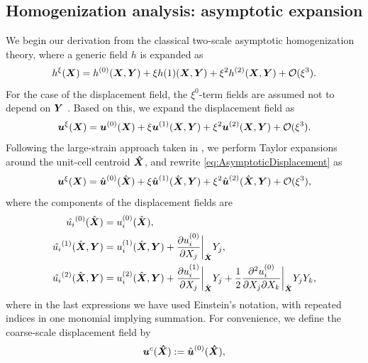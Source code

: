 \documentclass[preprint,3p,12pt,number,sort&compress]{elsarticle}
\def\vec   #1{\text{\boldmath $#1$}{}}
\begin{document}
\subsection{Homogenization analysis: asymptotic expansion}
We begin our derivation from the classical two-scale asymptotic homogenization theory, where a generic field $h$ is expanded as
\begin{equation}
    h^{\xi}({\vec X}) =h^{(0)}({\vec X}, \vec Y) +\xi h{(1)}({\vec X}, \vec Y) +\xi^2 h^{(2)}({\vec X}, \vec Y) + \mathcal O(\xi^3).
\end{equation} 
For the case of the displacement field, the $\xi^{0}$-term fields are assumed not to depend on $\vec Y$ \cite{fish2013practical}. Based on this, we expand the displacement field as
 \begin{equation}
	\vec u^{\xi} (\vec X) = {\vec u}^{(0)} ({\vec X}) + \xi {\vec u}^{(1)}({\vec X}, \vec Y) + \xi^2 {\vec u}^{(2)} ({\vec X}, \vec Y) + \mathcal O(\xi^3). \label{eq:AsymptoticDisplacement}
\end{equation}
Following the large-strain approach taken in \cite{fish2013practical,fish2008mathematical}, we perform Taylor expansions around the unit-cell centroid $\vec{\hat{X}}$, and rewrite \eqref{eq:AsymptoticDisplacement} as
\begin{equation}
	\vec u^{\xi} (\vec X) = \hat{\vec u}^{(0)} (\hat{\vec X}) + \xi \hat{\vec u}^{(1)}(\hat{\vec X}, \vec Y) + \xi^2 \hat{\vec u}^{(2)} (\hat{\vec X}, \vec Y) + \mathcal O(\xi^3), \label{eq:AsymptoticDisplacement}
\end{equation}
where the components of the displacement fields are
\begin{align}
      \hat{u_i}^{(0)} (\hat{\vec X}) &=u_i^{(0)}(\hat{\vec{X}}),\\
      \hat{u_i}^{(1)} (\hat{\vec X}, \vec Y)&=u_i^{(1)}(\hat{\vec{X}},\vec Y) + \frac{\partial u_i ^{(0)}}{\partial X_j}\bigg|_{\hat{\vec X}} Y_j,\\        \hat{u_i}^{(2)} (\hat{\vec X}, \vec Y) &=  u_i ^{(2)} (\hat{\vec{X}},\vec Y)+ \frac{\partial u_i ^{(1)}}{\partial X_j}\bigg|_{\hat{\vec X}} Y_j+ \frac{1}{2}\frac{\partial^{2} u_i ^{(0)}}{\partial X_j \partial X_k}\bigg|_{\hat{\vec X}}Y_j Y_k,
\end{align}
where in the last expressions we have used Einstein's notation, with repeated indices in one monomial implying summation. For convenience, we define the coarse-scale displacement field by
\begin{equation}
\vec u^c(\vec{\hat X}) := \hat{\vec u}^{(0)}(\vec{\hat X}), 
\end{equation}
\end{document}
